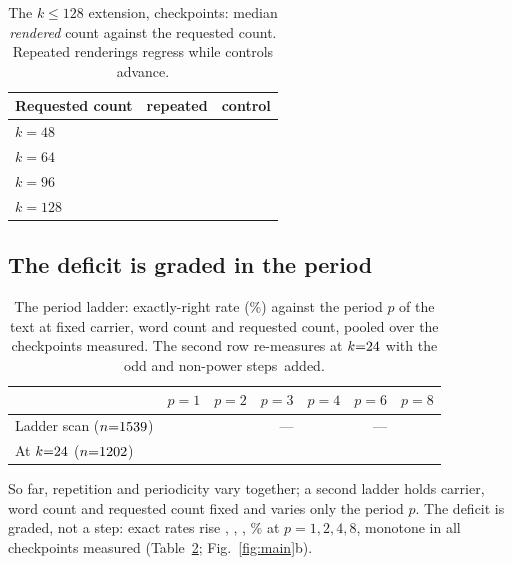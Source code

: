 \documentclass{article}
\newcommand{\tabsize}{\small}
\begin{document}
\begin{table}[t]
\centering
\caption{The $k\le128$ extension, \HzNModels{} checkpoints: median
\emph{rendered} count against the requested count. Repeated renderings
regress while controls advance.}
\label{tab:ext}
{\tabsize\setlength{\tabcolsep}{6pt}
\begin{tabular}{lrr}
\toprule
Requested count & repeated & control \\
\midrule
$k{=}48$  & \ExtRepFortyEight{} & \ExtCtlFortyEight{} \\
$k{=}64$  & \ExtRepSixtyFour{} & \ExtCtlSixtyFour{} \\
$k{=}96$  & \ExtRepNinetySix{} & \ExtCtlNinetySix{} \\
$k{=}128$ & \ExtRepOneTwoEight{} & \ExtCtlOneTwoEight{} \\
\bottomrule
\end{tabular}}
\end{table}

\subsection{The deficit is graded in the period}

\begin{table}[t]
\centering
\caption{The period ladder: exactly-right rate (\%) against the period $p$
of the text at fixed carrier, word count and requested count, pooled over
the \PerNCk{} checkpoints measured. The second row re-measures at
$k{=}24{}$ with the odd and non-power steps~added.}
\label{tab:period}
{\tabsize\setlength{\tabcolsep}{4.5pt}
\begin{tabular}{lrrrrrr}
\toprule
 & $p{=}1$ & $p{=}2$ & $p{=}3$ & $p{=}4$ & $p{=}6$ & $p{=}8$ \\
\midrule
Ladder scan ($n{=}1539{}$) & \PerPOne{} & \PerPTwo{} & --- & \PerPFour{} & --- & \PerPEight{} \\
At $k{=}24{}$ ($n{=}1202{}$) & \OddPOne{} & \OddPTwo{} & \OddPThree{} & \OddPFour{} & \OddPSix{} & \OddPEight{} \\
\bottomrule
\end{tabular}}
\end{table}

So far, repetition and periodicity vary together; a second ladder holds
carrier, word count and requested count fixed and varies only the period
$p$. The deficit is graded, not a step: exact rates rise
\PerPOne{}, \PerPTwo{}, \PerPFour{}, \PerPEight{}\% at $p{=}1,2,4,8$,
monotone in all \PerNCk{} checkpoints measured (Table~\ref{tab:period};
Fig.~\ref{fig:main}b).
\end{document}
